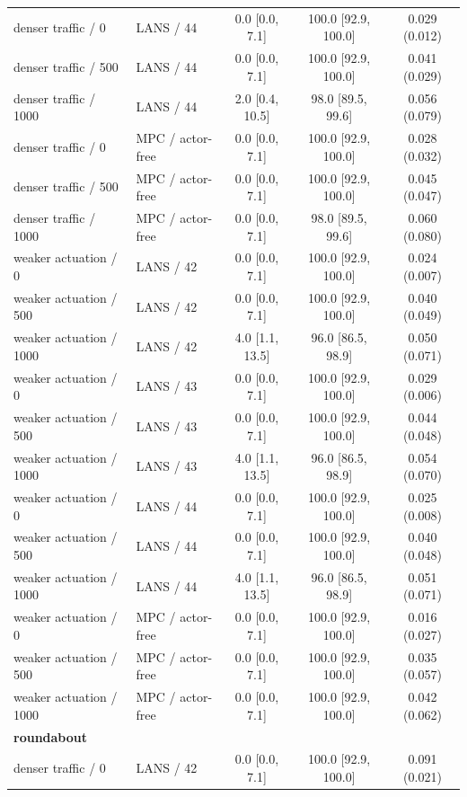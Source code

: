 \begin{longtable}{llccc}
denser traffic / 0 & LANS / 44 & 0.0 [0.0, 7.1] & 100.0 [92.9, 100.0] & 0.029 (0.012) \\
denser traffic / 500 & LANS / 44 & 0.0 [0.0, 7.1] & 100.0 [92.9, 100.0] & 0.041 (0.029) \\
denser traffic / 1000 & LANS / 44 & 2.0 [0.4, 10.5] & 98.0 [89.5, 99.6] & 0.056 (0.079) \\
denser traffic / 0 & MPC / actor-free & 0.0 [0.0, 7.1] & 100.0 [92.9, 100.0] & 0.028 (0.032) \\
denser traffic / 500 & MPC / actor-free & 0.0 [0.0, 7.1] & 100.0 [92.9, 100.0] & 0.045 (0.047) \\
denser traffic / 1000 & MPC / actor-free & 0.0 [0.0, 7.1] & 98.0 [89.5, 99.6] & 0.060 (0.080) \\
weaker actuation / 0 & LANS / 42 & 0.0 [0.0, 7.1] & 100.0 [92.9, 100.0] & 0.024 (0.007) \\
weaker actuation / 500 & LANS / 42 & 0.0 [0.0, 7.1] & 100.0 [92.9, 100.0] & 0.040 (0.049) \\
weaker actuation / 1000 & LANS / 42 & 4.0 [1.1, 13.5] & 96.0 [86.5, 98.9] & 0.050 (0.071) \\
weaker actuation / 0 & LANS / 43 & 0.0 [0.0, 7.1] & 100.0 [92.9, 100.0] & 0.029 (0.006) \\
weaker actuation / 500 & LANS / 43 & 0.0 [0.0, 7.1] & 100.0 [92.9, 100.0] & 0.044 (0.048) \\
weaker actuation / 1000 & LANS / 43 & 4.0 [1.1, 13.5] & 96.0 [86.5, 98.9] & 0.054 (0.070) \\
weaker actuation / 0 & LANS / 44 & 0.0 [0.0, 7.1] & 100.0 [92.9, 100.0] & 0.025 (0.008) \\
weaker actuation / 500 & LANS / 44 & 0.0 [0.0, 7.1] & 100.0 [92.9, 100.0] & 0.040 (0.048) \\
weaker actuation / 1000 & LANS / 44 & 4.0 [1.1, 13.5] & 96.0 [86.5, 98.9] & 0.051 (0.071) \\
weaker actuation / 0 & MPC / actor-free & 0.0 [0.0, 7.1] & 100.0 [92.9, 100.0] & 0.016 (0.027) \\
weaker actuation / 500 & MPC / actor-free & 0.0 [0.0, 7.1] & 100.0 [92.9, 100.0] & 0.035 (0.057) \\
weaker actuation / 1000 & MPC / actor-free & 0.0 [0.0, 7.1] & 100.0 [92.9, 100.0] & 0.042 (0.062) \\
\multicolumn{5}{l}{\textbf{roundabout}} \\
denser traffic / 0 & LANS / 42 & 0.0 [0.0, 7.1] & 100.0 [92.9, 100.0] & 0.091 (0.021) \\

\end{longtable}
